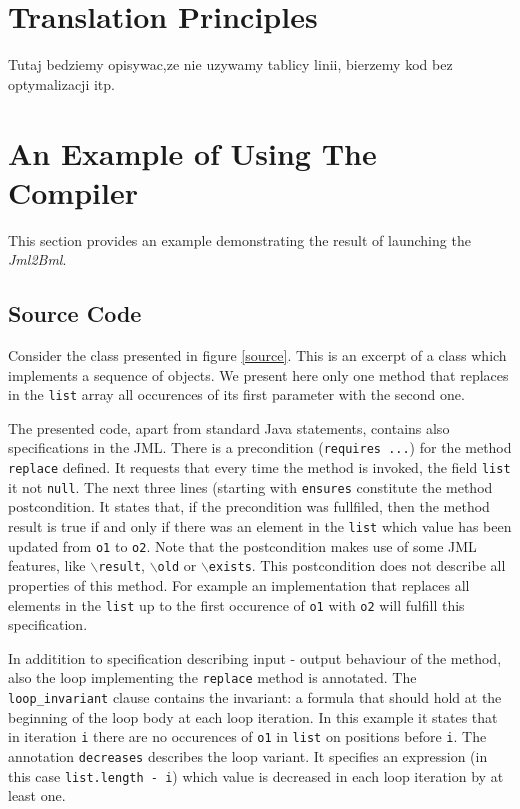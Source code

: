 \documentclass{acm_proc_article-sp}
\begin{document}
\section{Translation Principles}
Tutaj bedziemy opisywac,ze nie uzywamy tablicy linii, bierzemy kod bez optymalizacji itp.
\section{An Example of Using The\\Compiler}
This section provides an example demonstrating the result of launching the \textit{Jml2Bml}.
\subsection{Source Code}
Consider the class presented in figure \ref{source}. This is an excerpt of a class which implements a sequence of objects. We present here only one method that replaces in the \texttt{list} array all occurences of its first parameter with the second one.

The presented code, apart from standard Java statements, contains also specifications in the JML. There is a precondition (\texttt{requires ...}) for the method \texttt{replace} defined. It requests that every time the method is invoked, the field \texttt{list} it not \texttt{null}. The next three lines (starting with \texttt{ensures} constitute the method postcondition. It states that, if the precondition was fullfiled, then the method result is true if and only if there was an element in the \texttt{list} which value has been updated from \texttt{o1} to \texttt{o2}. Note that the postcondition makes use of some JML features, like \texttt{$\backslash$result}, \texttt{$\backslash$old} or \texttt{$\backslash$exists}. This postcondition does not describe all properties of this method. For example an implementation that replaces all elements in the \texttt{list} up to the first occurence of \texttt{o1} with \texttt{o2} will fulfill this specification.

In additition to specification describing input - output behaviour of the method, also the loop implementing the \texttt{replace} method is annotated. The \texttt{loop\_invariant} clause contains the invariant: a formula that should hold at the beginning of the loop body at each loop iteration. In this example it states that in iteration \texttt{i} there are no occurences of \texttt{o1} in \texttt{list} on positions before \texttt{i}. The annotation \texttt{decreases} describes the loop variant. It specifies an expression (in this case \texttt{list.length - i}) which value is decreased in each loop iteration by at least one.
\end{document}
